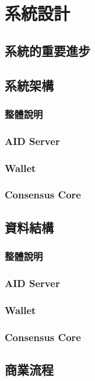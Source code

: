 
\chapter{系統設計}

\section{系統的重要進步}

\section{系統架構}
\subsection{整體說明}
\subsection{AID Server}
\subsection{Wallet}
\subsection{Consensus Core}

\section{資料結構}
\subsection{整體說明}
\subsection{AID Server}
\subsection{Wallet}
\subsection{Consensus Core}

\section{商業流程}